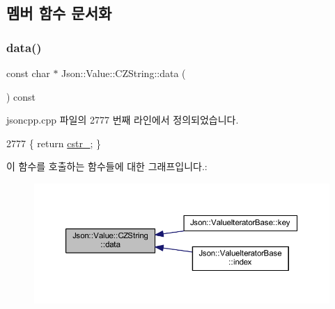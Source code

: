 \subsection{멤버 함수 문서화}
\mbox{\label{class_json_1_1_value_1_1_c_z_string_af6eee54f8dc43a1203d5af6ba0a5c9a2}} 
\subsubsection{\texorpdfstring{data()}{data()}}
{\footnotesize\ttfamily const char $\ast$ Json\+::\+Value\+::\+C\+Z\+String\+::data (\begin{DoxyParamCaption}{ }\end{DoxyParamCaption}) const}



jsoncpp.\+cpp 파일의 2777 번째 라인에서 정의되었습니다.


\begin{DoxyCode}
2777 \{ \textcolor{keywordflow}{return} \hyperlink{class_json_1_1_value_1_1_c_z_string_a5b4d28349294034d7f779c3c95d0306c}{cstr\_}; \}
\end{DoxyCode}
이 함수를 호출하는 함수들에 대한 그래프입니다.\+:\nopagebreak
\begin{figure}[H]
\begin{center}
\leavevmode
\includegraphics[width=350pt]{class_json_1_1_value_1_1_c_z_string_af6eee54f8dc43a1203d5af6ba0a5c9a2_icgraph}
\end{center}
\end{figure}
\mbox{\label{class_json_1_1_value_1_1_c_z_string_a0f3ba09401525d4f01dafd577122ee32}} 
